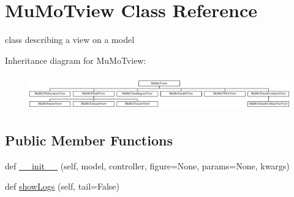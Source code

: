 \hypertarget{class_mu_mo_t_1_1_mu_mo_t_1_1_mu_mo_tview}{}\section{Mu\+Mo\+Tview Class Reference}
\label{class_mu_mo_t_1_1_mu_mo_t_1_1_mu_mo_tview}


class describing a view on a model  


Inheritance diagram for Mu\+Mo\+Tview\+:\begin{figure}[H]
\begin{center}
\leavevmode
\includegraphics[height=1.521739cm]{class_mu_mo_t_1_1_mu_mo_t_1_1_mu_mo_tview}
\end{center}
\end{figure}
\subsection*{Public Member Functions}
\begin{DoxyCompactItemize}
\item 
def \hyperlink{class_mu_mo_t_1_1_mu_mo_t_1_1_mu_mo_tview_a367325b3bd7ca4a7b7ec4107f9aa6a16}{\+\_\+\+\_\+init\+\_\+\+\_\+} (self, model, controller, figure=None, params=None, kwargs)
\item 
def \hyperlink{class_mu_mo_t_1_1_mu_mo_t_1_1_mu_mo_tview_a64ca78b9bf9f0f3150077ab79405a674}{show\+Logs} (self, tail=False)
\end{DoxyCompactItemize}
